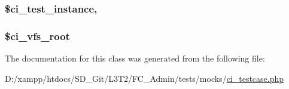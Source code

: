 \subsubsection[{\$ci\+\_\+test\+\_\+instance}]{\setlength{\rightskip}{0pt plus 5cm}\$ci\+\_\+test\+\_\+instance\hspace{0.3cm}{\ttfamily [static]}, {\ttfamily [protected]}}\label{class_c_i___test_case_abd33ad74f11902c8e804d62e27136aa2}
\hypertarget{class_c_i___test_case_a5cc3c10d43e82ad7c4227a2ba74d81a1}{}
\subsubsection[{\$ci\+\_\+vfs\+\_\+root}]{\setlength{\rightskip}{0pt plus 5cm}\$ci\+\_\+vfs\+\_\+root}\label{class_c_i___test_case_a5cc3c10d43e82ad7c4227a2ba74d81a1}


The documentation for this class was generated from the following file\+:\begin{DoxyCompactItemize}
\item 
D\+:/xampp/htdocs/\+S\+D\+\_\+\+Git/\+L3\+T2/\+F\+C\+\_\+\+Admin/tests/mocks/\hyperlink{ci__testcase_8php}{ci\+\_\+testcase.\+php}\end{DoxyCompactItemize}
